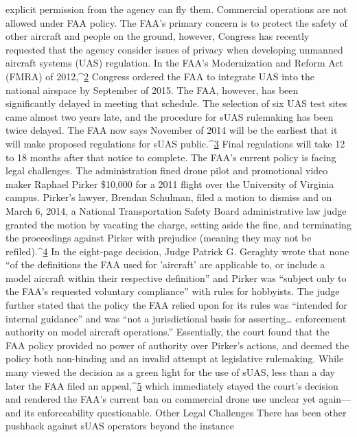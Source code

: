 explicit permission from the agency can fly them. Commercial operations
are not allowed under FAA policy.
The FAA's primary concern is to protect the safety of other aircraft and
people on the ground, however, Congress has recently requested that the
agency consider issues of privacy when developing unmanned aircraft systems
(UAS) regulation.
In the FAA's Modernization and Reform Act (FMRA) of 2012,^{\href{#endnotes-waite-and-osterreicher}{2}} Congress
ordered the FAA to integrate UAS into the national airspace by September
of 2015. The FAA, however, has been significantly delayed in meeting that
schedule. The selection of six UAS test sites came almost two years late, and
the procedure for sUAS rulemaking has been twice delayed. The FAA now
says November of 2014 will be the earliest that it will make proposed regulations
for sUAS public.^{\href{#endnotes-waite-and-osterreicher}{3}} Final regulations will take 12 to 18 months after
that notice to complete.
The FAA's current policy is facing legal challenges. The administration
fined drone pilot and promotional video maker Raphael Pirker \$10,000 for
a 2011 flight over the University of Virginia campus. Pirker's lawyer, Brendan
Schulman, filed a motion to dismiss and on March 6, 2014, a National
Transportation Safety Board administrative law judge granted the motion
by vacating the charge, setting aside the fine, and terminating the proceedings
against Pirker with prejudice (meaning they may not be refiled).^{\href{#endnotes-waite-and-osterreicher}{4}} In
the eight-page decision, Judge Patrick G. Geraghty wrote that none ``of the
definitions the FAA used for 'aircraft' are applicable to, or include a model
aircraft within their respective definition'' and Pirker was ``subject only to
the FAA's requested voluntary compliance'' with rules for hobbyists. The judge further stated that the policy the FAA relied upon for its rules was
``intended for internal guidance'' and was ``not a jurisdictional basis for
asserting… enforcement authority on model aircraft operations.''
Essentially, the court found that the FAA policy provided no power of
authority over Pirker's actions, and deemed the policy both non-binding
and an invalid attempt at legislative rulemaking. While many viewed the
decision as a green light for the use of sUAS, less than a day later the FAA
filed an appeal,^{\href{#endnotes-waite-and-osterreicher}{5}} which immediately stayed the court's decision and rendered
the FAA's current ban on commercial drone use unclear yet again—
and its enforceability questionable.
Other Legal Challenges
There has been other pushback against sUAS operators beyond the instance
